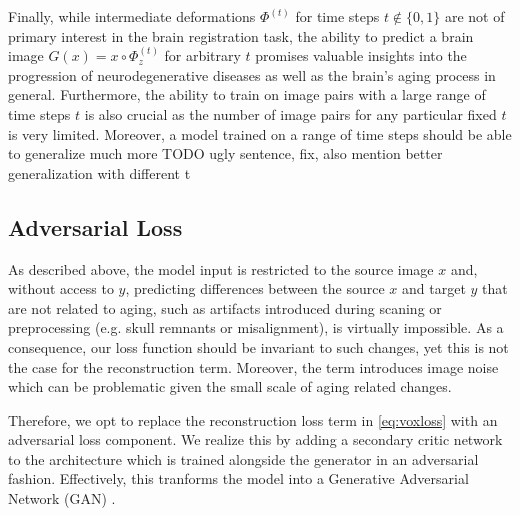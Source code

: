 Finally, while intermediate deformations $\Phi^{(t)}$ for time steps $t \notin \{0, 1\}$ are not of primary interest in the brain registration task, the ability to predict a brain image $G(x) = x \circ \Phi_z^{(t)}$ for arbitrary $t$ promises valuable insights into the progression of neurodegenerative diseases as well as the brain's aging process in general.
Furthermore, the ability to train on image pairs with a large range of time steps $t$ is also crucial as the number of image pairs for any particular fixed $t$ is very limited. Moreover, a model trained on a range of time steps should be able to generalize much more  TODO ugly sentence, fix, also mention better generalization with different t

\subsection{Adversarial Loss}

As described above, the model input is restricted to the source image $x$ and, without access to $y$, predicting differences between the source $x$ and target $y$ that are not related to aging, such as artifacts introduced during scaning or preprocessing (e.g. skull remnants or misalignment), is virtually impossible. As a consequence, our loss function should be invariant to such changes, yet this is not the case for the reconstruction term. Moreover, the term introduces image noise which can be problematic given the small scale of aging related changes.


Therefore, we opt to replace the reconstruction loss term in \autoref{eq:voxloss} with an adversarial loss component. We realize this by adding a secondary critic network to the architecture which is trained alongside the generator in an adversarial fashion. Effectively, this tranforms the model into a Generative Adversarial Network (GAN) \cite{goodfellow2014generative}.

